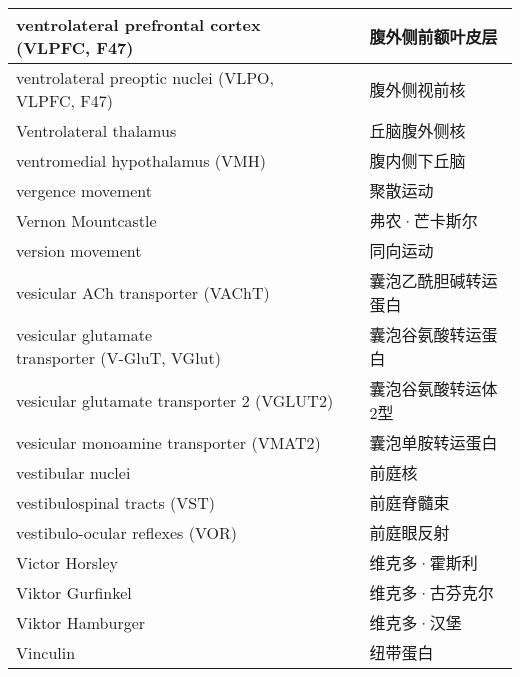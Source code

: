 \begin{longtable}{lll}
	\midrule
	ventrolateral prefrontal cortex (VLPFC, F47)   && 腹外侧前额叶皮层  \\
	
	\midrule
	ventrolateral preoptic nuclei (VLPO, VLPFC, F47)   && 腹外侧视前核  \\
	
	\midrule
	Ventrolateral thalamus   && 丘脑腹外侧核  \\
	
	\midrule
	ventromedial hypothalamus (VMH)  && 腹内侧下丘脑  \\
	
	\midrule
	vergence movement   && 聚散运动  \\
	
	\midrule
	Vernon Mountcastle   && 弗农·芒卡斯尔  \\
	
	\midrule
	version movement   && 同向运动  \\
	
	\midrule
	vesicular ACh transporter (VAChT)   && 囊泡乙酰胆碱转运蛋白  \\
	
	\midrule
	\makecell[l]{vesicular glutamate \\transporter (V-GluT, VGlut)}   && 囊泡谷氨酸转运蛋白  \\
	
	\midrule
	vesicular glutamate transporter 2 (VGLUT2)   && 囊泡谷氨酸转运体2型  \\
	
	\midrule
	vesicular monoamine transporter (VMAT2)   && 囊泡单胺转运蛋白  \\
	
	\midrule
	vestibular nuclei   && 前庭核  \\
	
	\midrule
	vestibulospinal tracts (VST)   && 前庭脊髓束  \\
	
	\midrule
	vestibulo-ocular reflexes (VOR)   && 前庭眼反射  \\
	
	\midrule
	Victor Horsley   && 维克多·霍斯利  \\
	
	\midrule
	Viktor Gurfinkel   && 维克多·古芬克尔  \\
	
	\midrule
	Viktor Hamburger   && 维克多·汉堡  \\
	
	\midrule
	Vinculin   && 纽带蛋白  \\
	

\end{longtable}
